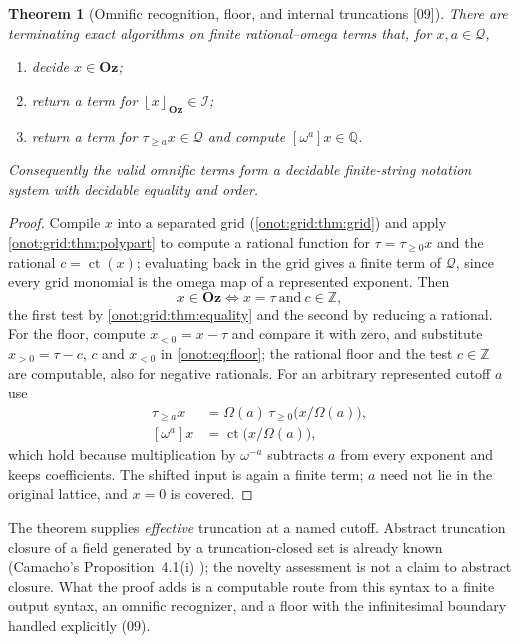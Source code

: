 \documentclass[11pt,oneside]{article}
\numberwithin{equation}{section}
\newtheorem{theorem}{Theorem}[section]
\theoremstyle{definition}
\theoremstyle{remark}
\newcommand{\Oz}{\mathbf{Oz}}
\newcommand{\Z}{\mathbb Z}
\newcommand{\Q}{\mathbb Q}
\newcommand{\QO}{\mathcal Q}
\newcommand{\IO}{\mathcal I}
\newcommand{\ct}{\operatorname{ct}}
\newcommand{\Om}{\Omega}
\newcommand{\tr}[1]{\tau_{\ge #1}}
\newcommand{\fl}[1]{\left\lfloor #1\right\rfloor_{\Oz}}
\newcommand{\src}[1]{\textup{\textsf{\small[#1]}}}
\begin{document}
\begin{theorem}[Omnific recognition, floor, and internal truncations \src{09}]\label{onot:grid:thm:effectivefloor}
There are terminating exact algorithms on finite rational--omega terms that, for
$x,a\in\QO$,
\begin{enumerate}[label=\textup{(\roman*)}]
\item decide $x\in\Oz$;
\item return a term for $\fl x\in\IO$;
\item return a term for $\tr a x\in\QO$ and compute $[\omega^a]x\in\Q$.
\end{enumerate}
Consequently the valid omnific terms form a decidable finite-string notation
system with decidable equality and order.
\end{theorem}
\begin{proof}
Compile $x$ into a separated grid (\cref{onot:grid:thm:grid}) and apply
\cref{onot:grid:thm:polypart} to compute a rational function for $\tau=\tr0x$ and
the rational $c=\ct(x)$; evaluating back in the grid gives a finite term of $\QO$,
since every grid monomial is the omega map of a represented exponent. Then
\begin{equation}\label{onot:grid:eq:membership}
 x\in\Oz\iff x=\tau\ \text{and}\ c\in\Z,
\end{equation}
the first test by \cref{onot:grid:thm:equality} and the second by reducing a
rational. For the floor, compute $x_{<0}=x-\tau$ and compare it with zero, and
substitute $x_{>0}=\tau-c$, $c$ and $x_{<0}$ in \eqref{onot:eq:floor}; the rational
floor and the test $c\in\Z$ are computable, also for negative rationals. For an
arbitrary represented cutoff $a$ use
\begin{align}
 \tr a x&=\Om(a)\,\tr0\bigl(x/\Om(a)\bigr),\label{onot:grid:eq:shifttrunc}\\
 [\omega^a]x&=\ct\bigl(x/\Om(a)\bigr),\label{onot:grid:eq:shiftcoeff}
\end{align}
which hold because multiplication by $\omega^{-a}$ subtracts $a$ from every
exponent and keeps coefficients. The shifted input is again a finite term; $a$
need not lie in the original lattice, and $x=0$ is covered.
\end{proof}

The theorem supplies \emph{effective} truncation at a named cutoff. Abstract
truncation closure of a field generated by a truncation-closed set is already
known (Camacho's Proposition~4.1(i) \cite{Camacho}); the novelty assessment is
not a claim to abstract closure. What the proof adds is a computable route from
this syntax to a finite output syntax, an omnific recognizer, and a floor with the
infinitesimal boundary handled explicitly (09).
\end{document}
